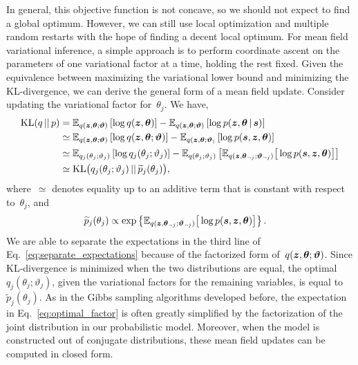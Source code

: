 In general, this objective function is not concave, so we should not
expect to find a global optimum. However, we can still use local
optimization and multiple random restarts with the hope of finding a
decent local optimum.  For mean field variational inference, a simple
approach is to perform coordinate ascent on the parameters of one
variational factor at a time, holding the rest fixed. Given the
equivalence between maximizing the variational lower bound and
minimizing the KL-divergence, we can derive the general form of a mean
field update. Consider updating the variational factor
for~$\theta_j$. We have,
\begin{align}
  \nonumber
  \mathrm{KL}(q {\,||\,} p) 
  &= \mathbb{E}_{q(\boldsymbol{z}, \boldsymbol{\theta}; \boldsymbol{\vartheta})} \left[ \log q(\boldsymbol{z}, \boldsymbol{\theta}) \right] 
  - \mathbb{E}_{q(\boldsymbol{z}, \boldsymbol{\theta}; \boldsymbol{\vartheta})} \left[ \log p(\boldsymbol{z}, \boldsymbol{\theta} \,|\, \boldsymbol{s}) \right] \\
  \nonumber
  &\simeq \mathbb{E}_{q(\boldsymbol{z}, \boldsymbol{\theta}; \boldsymbol{\vartheta})} \left[ \log q(\boldsymbol{z}, \boldsymbol{\theta}; \boldsymbol{\vartheta}) \right] 
  - \mathbb{E}_{q(\boldsymbol{z}, \boldsymbol{\theta}; \boldsymbol{\vartheta}_)} \left[ \log p(\boldsymbol{s}, \boldsymbol{z}, \boldsymbol{\theta}) \right]  \\
  \nonumber
  &\simeq \mathbb{E}_{q_j(\theta_j; \vartheta_j)} \left[ \log q_j(\theta_j ; \vartheta_j) \right] 
  - \mathbb{E}_{q(\theta_j; \vartheta_j)} \left[ \mathbb{E}_{q(\boldsymbol{z}, \boldsymbol{\theta}_{\neg j} ; \boldsymbol{\vartheta}_{\neg j})} \big[ \log p(\boldsymbol{s}, \boldsymbol{z}, \boldsymbol{\theta}) \big] \right] \\
  \label{eq:separate_expectations}
  &\simeq \mathrm{KL} \big( q_j(\theta_j; \vartheta_j) {\,||\,} \widetilde{p}_j(\theta_j) \big),
\end{align}
where~$\simeq$ denotes equality up to an additive term that is
constant with respect to~$\theta_j$, and
\begin{align}
  \label{eq:optimal_factor}
  \widetilde{p}_j(\theta_j) 
  &\propto \exp \left \{ \mathbb{E}_{q(\boldsymbol{z}, \boldsymbol{\theta}_{\neg j} ; \boldsymbol{\vartheta}_{\neg j})} \big[ \log p(\boldsymbol{s}, \boldsymbol{z}, \boldsymbol{\theta}) \big] \right \}.
\end{align}
We are able to separate the expectations in the third line of
Eq.~\ref{eq:separate_expectations} because of the factorized form
of~$q(\boldsymbol{z}, \boldsymbol{\theta}; \boldsymbol{\vartheta})$.
Since KL-divergence is minimized when the two
distributions are equal, the optimal~$q_j(\theta_j; \vartheta_j)$, given the
variational factors for the remaining variables, is equal
to~$\widetilde{p}_j(\theta_j)$.  As in the Gibbs sampling algorithms
developed before, the expectation in Eq.~\ref{eq:optimal_factor} is
often greatly simplified by the factorization of the joint
distribution in our probabilistic model. Moreover, when the model 
is constructed out of conjugate distributions, these mean field 
updates can be computed in closed form.

